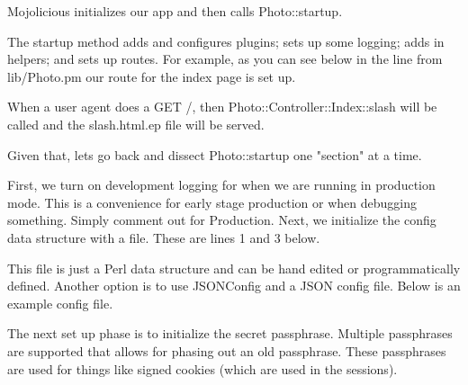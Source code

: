 \documentclass[14pt]{extreport}
\newcommand\Small{\fontsize{12}{13.0}\fontencoding{T1}\selectfont}
\newcommand*\LSTfont{\Small\ttfamily\SetTracking{encoding=*}{-60}\lsstyle}
\begin{document}
Mojolicious initializes our app and then calls Photo::startup.

The startup method adds and configures plugins; sets up some logging; adds in
helpers; and sets up routes.  For example, as you can see below in the line
from lib/Photo.pm our route for the index page is set up.



When a user agent does a GET /, then Photo::Controller::Index::slash will be
called and the slash.html.ep file will be served.

Given that, lets go back and dissect Photo::startup one "section" at a time.

First, we turn on development logging for when we are running in production
mode.  This is a convenience for early stage production or when debugging
something.  Simply comment out for Production.  Next, we initialize the
config data structure with a file.  These are lines 1 and 3 below.



This file is just a Perl data structure and can be hand edited or
programmatically defined.  Another option is to use JSONConfig and a JSON
config file.  Below is an example config file.



The next set up phase is to initialize the secret passphrase.  Multiple
passphrases are supported that allows for phasing out an old passphrase.  These
passphrases are used for things like signed cookies (which are used in the
sessions).




\end{document}

